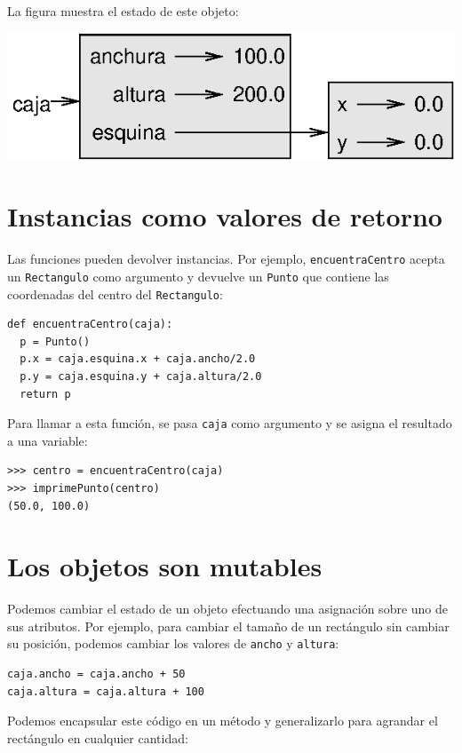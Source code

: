 La figura muestra el estado de este objeto:

\beforefig \centerline{\includegraphics{illustrations/rectangle}}
\afterfig

\section{Instancias como valores de retorno}

 

Las funciones pueden devolver instancias. Por ejemplo, \texttt{encuentraCentro}
acepta un \texttt{Rectangulo} como argumento y devuelve un \texttt{Punto}
que contiene las coordenadas del centro del \texttt{Rectangulo}:
\begin{lstlisting}
def encuentraCentro(caja):
  p = Punto()
  p.x = caja.esquina.x + caja.ancho/2.0
  p.y = caja.esquina.y + caja.altura/2.0
  return p
\end{lstlisting}
Para llamar a esta función, se pasa \texttt{caja} como argumento y
se asigna el resultado a una variable:
\begin{lstlisting}
>>> centro = encuentraCentro(caja)
>>> imprimePunto(centro)
(50.0, 100.0)
\end{lstlisting}
\section{Los objetos son mutables}

 

Podemos cambiar el estado de un objeto efectuando una asignación sobre
uno de sus atributos. Por ejemplo, para cambiar el tamaño de un rectángulo
sin cambiar su posición, podemos cambiar los valores de \texttt{ancho}
y \texttt{altura}:
\begin{lstlisting}
caja.ancho = caja.ancho + 50
caja.altura = caja.altura + 100
\end{lstlisting}
Podemos encapsular este código en un método y generalizarlo para agrandar
el rectángulo en cualquier cantidad:

